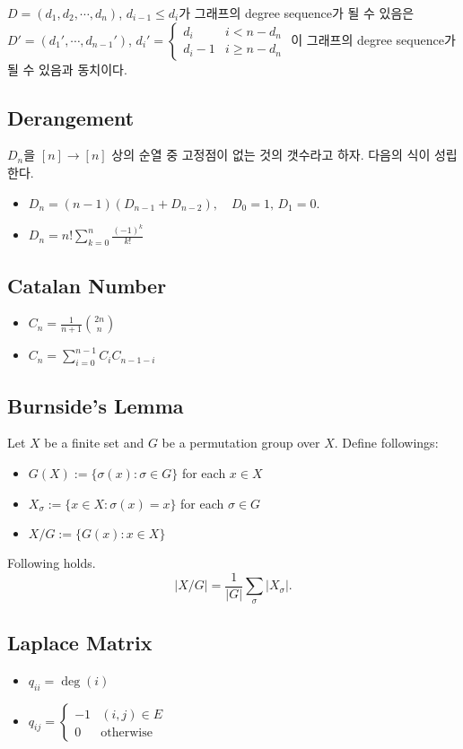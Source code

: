 $D = (d_1, d_2, \cdots, d_n)$, $d_{i-1} \le d_i$가 그래프의 degree sequence가 될 수 있음은 $D' = (d_1', \cdots, d_{n-1}')$, $d_i' = \begin{cases} d_i & i < n-d_n \\ d_i-1 & i \ge n - d_n \end{cases}$
이 그래프의 degree sequence가 될 수 있음과 동치이다.

\subsection{Derangement}
$D_n$을 $[n] \to [n]$ 상의 순열 중 고정점이 없는 것의 갯수라고 하자.
다음의 식이 성립한다.
\begin{itemize}
    \item $D_n = (n-1)(D_{n-1}+D_{n-2}), \quad D_0 = 1,\, D_1 = 0.$
    \item $D_n = n! \sum_{k=0}^{n} \frac{(-1)^k}{k!}$
\end{itemize}

\subsection{Catalan Number}
\begin{itemize}
    \item $C_n = \frac{1}{n+1} {2n \choose n}$
    \item $C_n = \sum_{i=0}^{n-1} C_i C_{n-1-i}$
\end{itemize}

\subsection{Burnside's Lemma}
Let $X$ be a finite set and $G$ be a permutation group over $X$.
Define followings:
\begin{itemize}
    \item $G(X) := \{ \sigma(x) : \sigma \in G \}$ for each $x \in X$
    \item $X_\sigma := \{x \in X : \sigma(x) = x\}$ for each $\sigma \in G$
    \item $X/G := \{G(x) : x \in X \}$
\end{itemize}
Following holds.
$$ |X / G| = \frac{1}{|G|} \sum_{\sigma} |X_\sigma|. $$
\iffalse
\subsection{Laplace Matrix}
\begin{itemize}
    \item $q_{ii} = \deg (i)$
    \item $q_{ij} = \begin{cases} -1 & (i,j) \in E \\ 0 & \text{otherwise}\end{cases}$
\end{itemize}

